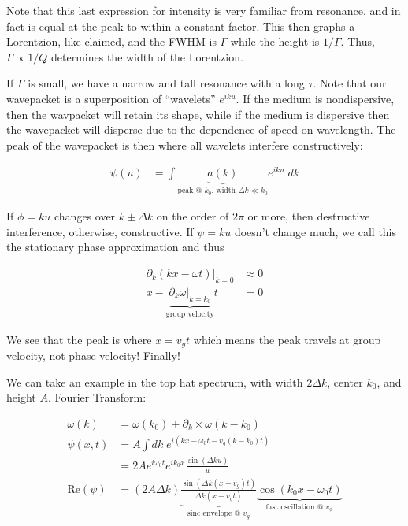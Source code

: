 \documentclass{report}
\begin{document}
Note that this last expression for intensity is very familiar from resonance, and in fact is equal at the peak to within a constant factor. This then graphs a Lorentzion, like claimed, and the FWHM is $\Gamma$ while the height is $1/\Gamma$. Thus, $\Gamma \propto 1/Q$ determines the width of the Lorentzion. 

If $\Gamma$ is small, we have a narrow and tall resonance with a long $\tau$. Note that our wavepacket is a superposition of ``wavelets'' $e^{iku}$. If the medium is nondispersive, then the wavpacket will retain its shape, while if the medium is dispersive then the wavepacket will disperse due to the dependence of speed on wavelength. The peak of the wavepacket is then where all wavelets interfere constructively:

\begin{align*}
\psi(u) &= \int{\underbrace{a(k)}_{\text{peak @ $k_0$, width $\Delta k \ll k_0$}}e^{iku}\;dk}
\end{align*}

If $\phi = ku$ changes over $k \pm \Delta k$ on the order of $2\pi$ or more, then destructive interference, otherwise, constructive. If $\psi = ku$ doesn't change much, we call this the stationary phase approximation and thus

\begin{align*}
\partial_k (kx - \omega t)\bigg|_{k=0} &\approx 0\\
x - \underbrace{\partial_k \omega \bigg|_{k=k_0}}_{\textrm{group velocity}}t &= 0
\end{align*}

We see that the peak is where $x = v_gt$ which means the peak travels at group velocity, not phase velocity! Finally!

We can take an example in the top hat spectrum, with width $2\Delta k$, center $k_0$, and height $A$. Fourier Transform:

\begin{align*}
\omega(k) &= \omega(k_0) + \partial_k \times \omega(k-k_0)\\
\psi(x,t) &= A\int{dk\;e^{i(kx - \omega_0t - v_g(k-k_0)t)}}\\
&= 2Ae^{i\omega_0t}e^{ik_0x} \frac{\sin(\Delta k u)}{u}\\
\mathrm{Re}(\psi) &= (2A\Delta k)\underbrace{\frac{\sin(\Delta k(x-v_g)t)}{\Delta k(x - v_gt)}}_{\text{sinc envelope @ $v_g$}} \underbrace{\cos(k_0x - \omega_0t)}_{\text{fast oscillation @ $v_\phi$}}
\end{align*}
\end{document}

